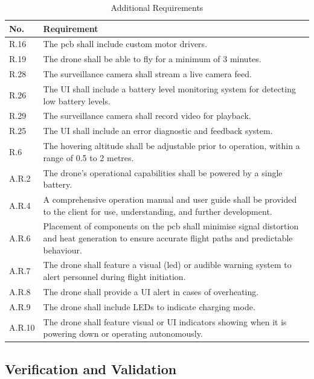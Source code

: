 \begin{table}[H]
\centering
\caption{Additional Requirements}
\begin{tabular}{|>{\centering\arraybackslash}p{} | p{}|}
\hline
\rowcolor{gray!15}
\textbf{No.} & \textbf{Requirement} \\
\hline
R.16 & The \gls{pcb} shall include custom motor drivers. \\
\hline
R.19 & The drone shall be able to fly for a minimum of 3 minutes. \\
\hline
R.28 & The surveillance camera shall stream a live camera feed. \\
\hline
R.26 & The UI shall include a battery level monitoring system for detecting low battery levels. \\
\hline
R.29 & The surveillance camera shall record video for playback. \\
\hline
R.25 & The UI shall include an error diagnostic and feedback system. \\
\hline
R.6  & The hovering altitude shall be adjustable prior to operation, within a range of 0.5 to 2 metres. \\
\hline
A.R.2 & The drone’s operational capabilities shall be powered by a single battery. \\
\hline
A.R.4 & A comprehensive operation manual and user guide shall be provided to the client for use, understanding, and further development. \\
\hline
A.R.6 & Placement of components on the \gls{pcb} shall minimise signal distortion and heat generation to ensure accurate flight paths and predictable behaviour. \\
\hline
A.R.7 & The drone shall feature a visual (\gls{led}) or audible warning system to alert personnel during flight initiation. \\
\hline
A.R.8 & The drone shall provide a UI alert in cases of overheating. \\
\hline
A.R.9 & The drone shall include LEDs to indicate charging mode. \\
\hline
A.R.10 & The drone shall feature visual or UI indicators showing when it is powering down or operating autonomously. \\
\hline
\end{tabular}
\end{table}

\pagebreak
\subsection{Verification and Validation}
\label{app:v-and-v}

